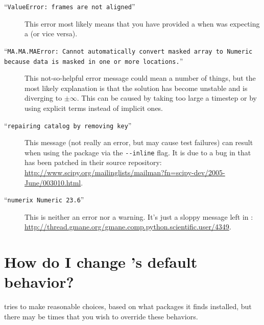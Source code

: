         \begin{description}
            
            \item[``\texttt{ValueError: frames are not aligned}'']
            
            This error most likely means that you have provided a
             when \FiPy{} was expecting a
             (or vice versa).

            \item[``\texttt{MA.MA.MAError: Cannot automatically
            convert masked array to Numeric because data is masked in one or
            more locations.}'']
            
            This not-so-helpful error message could mean a number of things,
            but the most likely explanation is that the solution has become
            unstable and is diverging to $\pm\infty$.  This can be caused by
            taking too large a timestep or by using explicit terms instead of
            implicit ones.
            
            \item[``\texttt{repairing catalog by removing key}'']
            
            This message (not really an error, but may cause test 
            failures) can result when using the \SciPy{} \weave{} 
            package via the \verb+--inline+ flag. It is due to a bug
            in \SciPy{} that has been patched in their source 
            repository: \url{http://www.scipy.org/mailinglists/mailman?fn=scipy-dev/2005-June/003010.html}.
            
            \item[``\texttt{numerix Numeric 23.6}'']
            
            This is neither an error nor a warning. It's just a sloppy 
            message left in \SciPy{}:
            \url{http://thread.gmane.org/gmane.comp.python.scientific.user/4349}.
            
        \end{description}
        
    \section{How do I change \FiPy{}'s default behavior?}
        \label{FAQ-FlagsAndEnvironmentVariables}
        \FiPy{} tries to make reasonable choices, based on what 
        packages it finds installed, but there may be times that you 
        wish to override these behaviors. 

